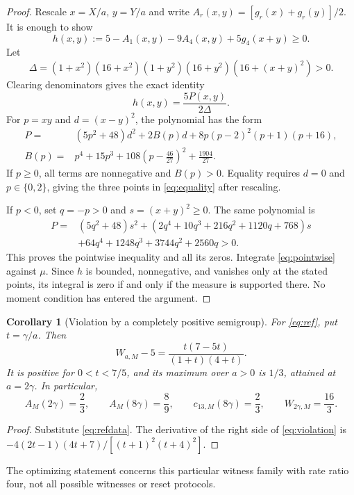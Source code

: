\documentclass[11pt,a4paper]{article}
\newtheorem{corollary}[theorem]{Corollary}
\begin{document}
\begin{proof}
Rescale $x=X/a$, $y=Y/a$ and write
$A_r(x,y)=[g_r(x)+g_r(y)]/2$. It is enough to show
\begin{equation}\label{eq:pointwise}
 h(x,y):=5-A_1(x,y)-9A_4(x,y)+5g_4(x+y)\geq0.
\end{equation}
Let
\[
 \Delta=(1+x^2)(16+x^2)(1+y^2)(16+y^2)(16+(x+y)^2)>0.
\]
Clearing denominators gives the exact identity
\begin{equation}\label{eq:certificate}
 h(x,y)=\frac{5P(x,y)}{2\Delta}.
\end{equation}
For $p=xy$ and $d=(x-y)^2$, the polynomial has the form
\begin{align}\label{eq:positivecase}
 P={}&(5p^2+48)d^2+2B(p)d
       +8p(p-2)^2(p+1)(p+16),\\
 B(p)={}&p^4+15p^3+108\left(p-\frac{46}{27}\right)^2
                +\frac{1904}{27}.\nonumber
\end{align}
If $p\geq0$, all terms are nonnegative and $B(p)>0$.
Equality requires $d=0$ and $p\in\{0,2\}$, giving the three points
in \eqref{eq:equality} after rescaling.

If $p<0$, set $q=-p>0$ and $s=(x+y)^2\geq0$. The same polynomial is
\begin{align}\label{eq:negativecase}
 P={}&(5q^2+48)s^2
 +(2q^4+10q^3+216q^2+1120q+768)s\\
 &+64q^4+1248q^3+3744q^2+2560q>0.\nonumber
\end{align}
This proves the pointwise inequality and all its zeros. Integrate
\eqref{eq:pointwise} against $\mu$. Since $h$ is bounded,
nonnegative, and vanishes only at the stated points, its integral is
zero if and only if the measure is supported there. No moment
condition has entered the argument.
\end{proof}

\begin{corollary}[Violation by a completely positive semigroup]
For \eqref{eq:ref}, put $t=\gamma/a$. Then
\begin{equation}\label{eq:violation}
 W_{a,M}-5=\frac{t(7-5t)}{(1+t)(4+t)}.
\end{equation}
It is positive for $0<t<7/5$, and its maximum over $a>0$ is $1/3$,
attained at $a=2\gamma$. In particular,
\[
 A_M(2\gamma)=\frac23,\qquad A_M(8\gamma)=\frac89,
 \qquad c_{13,M}(8\gamma)=\frac23,
 \qquad W_{2\gamma,M}=\frac{16}{3}.
\]
\end{corollary}
\begin{proof}
Substitute \eqref{eq:refdata}. The derivative of the right side of
\eqref{eq:violation} is
$-4(2t-1)(4t+7)/[(t+1)^2(t+4)^2]$.
\end{proof}
The optimizing statement concerns this particular witness family with
rate ratio four, not all possible witnesses or reset protocols.
\end{document}
